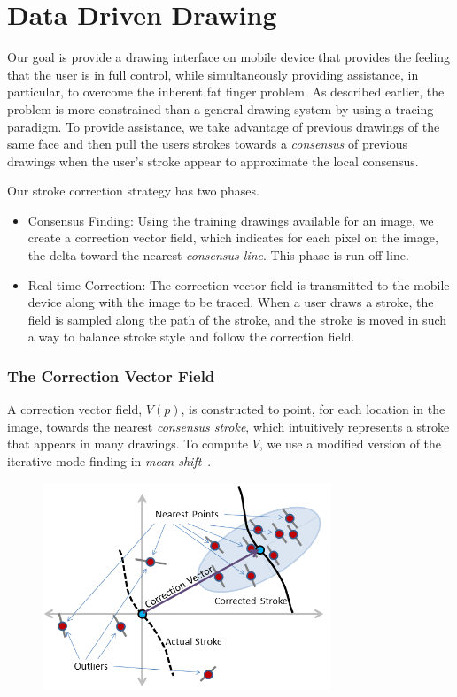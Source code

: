 \section{Data Driven Drawing}

Our goal is provide a drawing interface on mobile device that provides the feeling that the user is in full control, while simultaneously providing assistance, in particular, to overcome the inherent fat finger problem. As described earlier, the problem is more constrained than a general drawing system by using a tracing paradigm. To provide assistance, we take advantage of previous drawings of the same face and then pull the users strokes towards a {\em consensus} of previous drawings when the user's stroke appear to approximate the local consensus.

Our stroke correction strategy has two phases.
\begin{itemize}
\item Consensus Finding: Using the training drawings available for an image, we create a correction vector field, which indicates for each pixel on the image, the delta toward the nearest {\em consensus line}.  This phase is run off-line.
\item Real-time Correction: The correction vector field is transmitted to the mobile device along with the image to be traced.  When a user draws a stroke, the field is sampled along the path of the stroke, and the stroke is moved in such a way to balance stroke style and follow the correction field.
\end{itemize}

\subsubsection{The Correction Vector Field}


A correction vector field, $V(p)$, is constructed to point, for each location in the image, towards the nearest {\em consensus stroke}, which intuitively represents a stroke that appears in many drawings. To compute $V$, we use a modified version of the iterative mode finding in {\em mean shift}~\cite{10.1109/ICCV.1999.790416}.


\begin{figure}
  \centering%
  \includegraphics[width=3.4in]{ellipse.png}
  \caption{  }
  \label{fig:ellipse}
\end{figure}


